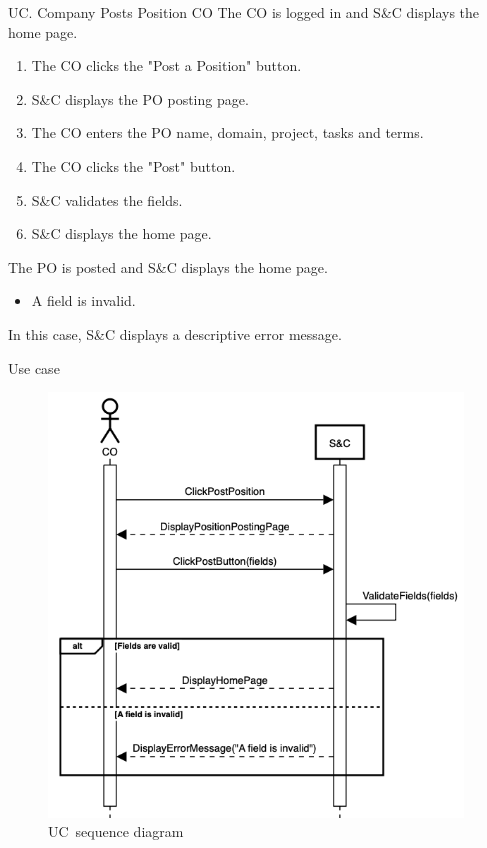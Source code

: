 \clearpage
\begin{usecase}
    {UC\theuc. Company Posts Position}
    {CO}
    {The CO is logged in and S\&C displays the home page.}
    {\begin{enumerate}[leftmargin=*]
        \item The CO clicks the "Post a Position" button.
        \item S\&C displays the PO posting page.
        \item The CO enters the PO name, domain, project, tasks and terms.
        \item The CO clicks the "Post" button.
        \item S\&C validates the fields.
        \item S\&C displays the home page.
    \end{enumerate}}
    {The PO is posted and S\&C displays the home page.}
    {\begin{itemize}[leftmargin=*, label=\tiny\textbullet]
        \item A field is invalid.
    \end{itemize}
    In this case, S\&C displays a descriptive error message.}
    {Use case \theuc}
\end{usecase}

\begin{figure}
    \centering
    \includegraphics[width=11cm]{images/sequence-diagrams/company-posts-position.png}
    \caption{UC\theuc\ sequence diagram}
\end{figure}


